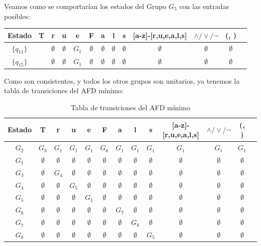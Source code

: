 Veamos como se comportarían los estados del Grupo $G_5$ con las entradas posibles:

\begin{table}[h!]
\centering
\begin{tabular}{|c|c|c|c|c|c|c|c|c|c|c|c|c|}
\hline
Estado &T & r & u & e & F & a & l &s &[a-z]-[r,u,e,a,l,s] &$\land/\lor/\lnot$ & (, )\\ \hline
\hline
$\{q_{11}\}$ & &  $\emptyset$& $\emptyset$ &  $G_1$& $\emptyset$  & $\emptyset$ & $\emptyset$ & $\emptyset$ & $\emptyset$ & $\emptyset$ & $\emptyset$\\ \hline
$\{q_{15}\}$ & &  $\emptyset$& $\emptyset$ & $G_1$ & $\emptyset$  & $\emptyset$ & $\emptyset$ & $\emptyset$ & $\emptyset$ & $\emptyset$ & $\emptyset$\\ \hline
\end{tabular}
\end{table}

Como son consistentes, y todos los otros grupos son unitarios, ya tenemos la tabla de transiciones del AFD mínimo:

\begin{table}[h!]
\centering
\begin{tabular}{|c|c|c|c|c|c|c|c|c|c|c|c|c|}
\hline
Estado &T & r & u & e & F & a & l &s &[a-z]-[r,u,e,a,l,s] &$\land/\lor/\lnot$ & (, )\\ \hline
\hline
$G_2$ & $ G_3$ & $ G_1$ & $G_1$ & $G_1$ & $G_6$ & $G_1$ & $G_1$ & $G_1$ & $G_1$ & $G_1$ & $G_1$\\ \hline
$G_1$ & $\emptyset$ & $\emptyset$ & $\emptyset$ & $\emptyset$ & $\emptyset$ & $\emptyset$ & $\emptyset$ & $\emptyset $ & $\emptyset$ & $\emptyset$ & $\emptyset$\\ \hline
$G_3$ & $\emptyset$ & $G_4$ & $\emptyset$ & $\emptyset$ & $\emptyset$  & $\emptyset$ & $\emptyset$ & $\emptyset$ & $\emptyset$ & $\emptyset$ & $\emptyset$\\ \hline
$G_4$ & $\emptyset$ &  $\emptyset$&  $G_5$& $\emptyset$ & $\emptyset$  & $\emptyset$ & $\emptyset$ & $\emptyset$ & $\emptyset$ & $\emptyset$ & $\emptyset$\\ \hline
$G_5$ & $\emptyset$ &  $\emptyset$& $\emptyset$ &  $G_1$& $\emptyset$  & $\emptyset$ & $\emptyset$ & $\emptyset$ & $\emptyset$ & $\emptyset$ & $\emptyset$\\ \hline
$G_6$ & $\emptyset$ & $\emptyset$ & $\emptyset$ & $\emptyset$  & $\emptyset$  & $G_7$ & $\emptyset$ & $\emptyset$& $\emptyset$ & $\emptyset$ & $\emptyset$\\ \hline
$G_7$ & $\emptyset$ &  $\emptyset$& $\emptyset$ & $\emptyset$ & $\emptyset$  & $\emptyset$ & $G_8$ & $\emptyset$ & $\emptyset$ & $\emptyset$ & $\emptyset$\\ \hline
$G_8$ & $\emptyset$ &  $\emptyset$& $\emptyset$ & $\emptyset$ & $\emptyset$  & $\emptyset$ & $\emptyset$ & $G_5$ & $\emptyset$ & $\emptyset$ & $\emptyset$\\ \hline
\end{tabular}
\caption{Tabla de transiciones del AFD mínimo}
\end{table}





